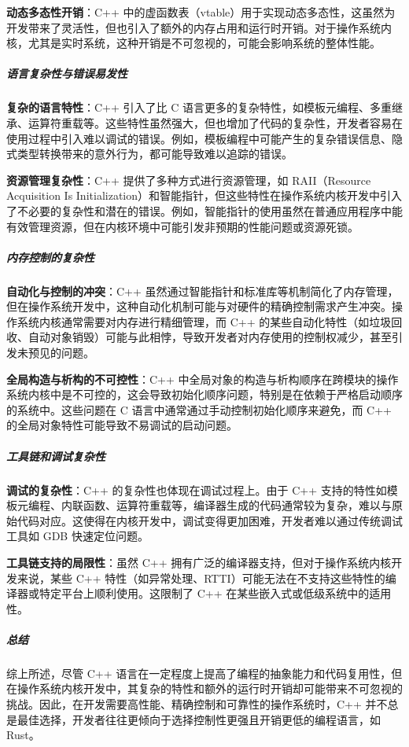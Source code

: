 \textbf{动态多态性开销}：C++ 中的虚函数表（vtable）用于实现动态多态性，这虽然为开发带来了灵活性，但也引入了额外的内存占用和运行时开销。对于操作系统内核，尤其是实时系统，这种开销是不可忽视的，可能会影响系统的整体性能。

\subparagraph{语言复杂性与错误易发性}

\textbf{复杂的语言特性}：C++ 引入了比 C 语言更多的复杂特性，如模板元编程、多重继承、运算符重载等。这些特性虽然强大，但也增加了代码的复杂性，开发者容易在使用过程中引入难以调试的错误。例如，模板编程中可能产生的复杂错误信息、隐式类型转换带来的意外行为，都可能导致难以追踪的错误。

\textbf{资源管理复杂性}：C++ 提供了多种方式进行资源管理，如 RAII（Resource Acquisition Is Initialization）和智能指针，但这些特性在操作系统内核开发中引入了不必要的复杂性和潜在的错误。例如，智能指针的使用虽然在普通应用程序中能有效管理资源，但在内核环境中可能引发非预期的性能问题或资源死锁。

\subparagraph{内存控制的复杂性}

\textbf{自动化与控制的冲突}：C++ 虽然通过智能指针和标准库等机制简化了内存管理，但在操作系统开发中，这种自动化机制可能与对硬件的精确控制需求产生冲突。操作系统内核通常需要对内存进行精细管理，而 C++ 的某些自动化特性（如垃圾回收、自动对象销毁）可能与此相悖，导致开发者对内存使用的控制权减少，甚至引发未预见的问题。

\textbf{全局构造与析构的不可控性}：C++ 中全局对象的构造与析构顺序在跨模块的操作系统内核中是不可控的，这会导致初始化顺序问题，特别是在依赖于严格启动顺序的系统中。这些问题在 C 语言中通常通过手动控制初始化顺序来避免，而 C++ 的全局对象特性可能导致不易调试的启动问题。

\subparagraph{工具链和调试复杂性}

\textbf{调试的复杂性}：C++ 的复杂性也体现在调试过程上。由于 C++ 支持的特性如模板元编程、内联函数、运算符重载等，编译器生成的代码通常较为复杂，难以与原始代码对应。这使得在内核开发中，调试变得更加困难，开发者难以通过传统调试工具如 GDB 快速定位问题。

\textbf{工具链支持的局限性}：虽然 C++ 拥有广泛的编译器支持，但对于操作系统内核开发来说，某些 C++ 特性（如异常处理、RTTI）可能无法在不支持这些特性的编译器或特定平台上顺利使用。这限制了 C++ 在某些嵌入式或低级系统中的适用性。

\subparagraph{总结}

综上所述，尽管 C++ 语言在一定程度上提高了编程的抽象能力和代码复用性，但在操作系统内核开发中，其复杂的特性和额外的运行时开销却可能带来不可忽视的挑战。因此，在开发需要高性能、精确控制和可靠性的操作系统时，C++ 并不总是最佳选择，开发者往往更倾向于选择控制性更强且开销更低的编程语言，如 Rust。


